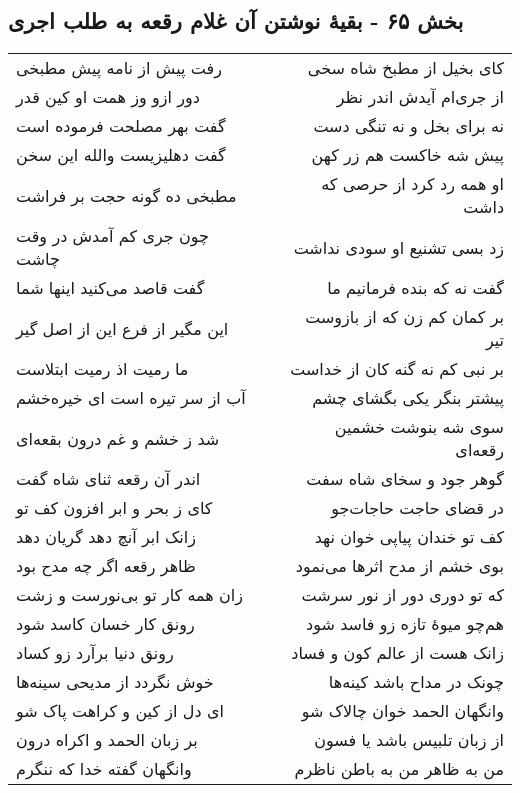 \begin{center}
\section*{بخش ۶۵ - بقیهٔ نوشتن آن غلام رقعه به طلب اجری}
\label{sec:sh065}
\begin{longtable}{l p{0.5cm} r}
رفت پیش از نامه پیش مطبخی
&&
کای بخیل از مطبخ شاه سخی
\\
دور ازو وز همت او کین قدر
&&
از جری‌ام آیدش اندر نظر
\\
گفت بهر مصلحت فرموده است
&&
نه برای بخل و نه تنگی دست
\\
گفت دهلیزیست والله این سخن
&&
پیش شه خاکست هم زر کهن
\\
مطبخی ده گونه حجت بر فراشت
&&
او همه رد کرد از حرصی که داشت
\\
چون جری کم آمدش در وقت چاشت
&&
زد بسی تشنیع او سودی نداشت
\\
گفت قاصد می‌کنید اینها شما
&&
گفت نه که بنده فرمانیم ما
\\
این مگیر از فرع این از اصل گیر
&&
بر کمان کم زن که از بازوست تیر
\\
ما رمیت اذ رمیت ابتلاست
&&
بر نبی کم نه گنه کان از خداست
\\
آب از سر تیره است ای خیره‌خشم
&&
پیشتر بنگر یکی بگشای چشم
\\
شد ز خشم و غم درون بقعه‌ای
&&
سوی شه بنوشت خشمین رقعه‌ای
\\
اندر آن رقعه ثنای شاه گفت
&&
گوهر جود و سخای شاه سفت
\\
کای ز بحر و ابر افزون کف تو
&&
در قضای حاجت حاجات‌جو
\\
زانک ابر آنچ دهد گریان دهد
&&
کف تو خندان پیاپی خوان نهد
\\
ظاهر رقعه اگر چه مدح بود
&&
بوی خشم از مدح اثرها می‌نمود
\\
زان همه کار تو بی‌نورست و زشت
&&
که تو دوری دور از نور سرشت
\\
رونق کار خسان کاسد شود
&&
هم‌چو میوهٔ تازه زو فاسد شود
\\
رونق دنیا برآرد زو کساد
&&
زانک هست از عالم کون و فساد
\\
خوش نگردد از مدیحی سینه‌ها
&&
چونک در مداح باشد کینه‌ها
\\
ای دل از کین و کراهت پاک شو
&&
وانگهان الحمد خوان چالاک شو
\\
بر زبان الحمد و اکراه درون
&&
از زبان تلبیس باشد یا فسون
\\
وانگهان گفته خدا که ننگرم
&&
من به ظاهر من به باطن ناظرم
\\
\end{longtable}
\end{center}
